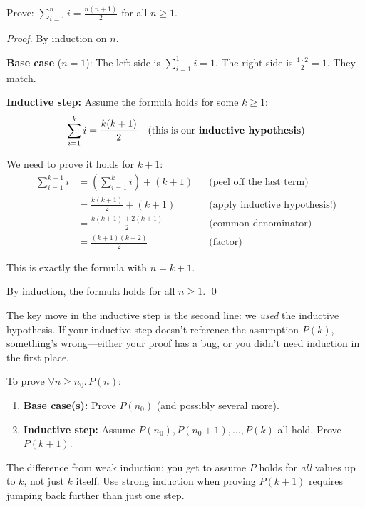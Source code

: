 \begin{example}
Prove: $\displaystyle\sum_{i=1}^{n} i = \frac{n(n+1)}{2}$ for all $n \geq 1$.

\emph{Proof.} By induction on $n$.

\textbf{Base case} ($n = 1$): The left side is $\sum_{i=1}^{1} i = 1$. The right side is $\frac{1 \cdot 2}{2} = 1$. They match. \checkmark

\textbf{Inductive step:} Assume the formula holds for some $k \geq 1$:
\[
\sum_{i=1}^{k} i = \frac{k(k+1)}{2} \quad \text{(this is our \textbf{inductive hypothesis})}
\]

We need to prove it holds for $k+1$:
\begin{align*}
\sum_{i=1}^{k+1} i &= \left(\sum_{i=1}^{k} i\right) + (k+1) && \text{(peel off the last term)} \\
&= \frac{k(k+1)}{2} + (k+1) && \text{(apply inductive hypothesis!)} \\
&= \frac{k(k+1) + 2(k+1)}{2} && \text{(common denominator)} \\
&= \frac{(k+1)(k+2)}{2} && \text{(factor)}
\end{align*}

This is exactly the formula with $n = k+1$. \checkmark

By induction, the formula holds for all $n \geq 1$. \qed
\end{example}

The key move in the inductive step is the second line: we \emph{used} the inductive hypothesis. If your inductive step doesn't reference the assumption $P(k)$, something's wrong---either your proof has a bug, or you didn't need induction in the first place.

\begin{strategy}
To prove $\forall n \geq n_0.\, P(n)$:
\begin{enumerate}
  \item \textbf{Base case(s):} Prove $P(n_0)$ (and possibly several more).
  \item \textbf{Inductive step:} Assume $P(n_0), P(n_0+1), \ldots, P(k)$ all hold. Prove $P(k+1)$.
\end{enumerate}

The difference from weak induction: you get to assume $P$ holds for \emph{all} values up to $k$, not just $k$ itself. Use strong induction when proving $P(k+1)$ requires jumping back further than just one step.
\end{strategy}

